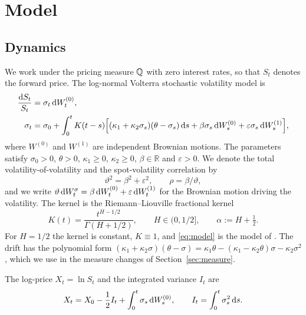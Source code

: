 \section{Model}\label{sec:model}

\subsection{Dynamics}

We work under the pricing measure $\mathbb{Q}$ with zero interest rates, so that $S_t$ denotes the forward price. The log-normal Volterra stochastic volatility model is
\begin{equation}\label{eq:model}
\begin{split}
\frac{\D S_t}{S_t} &= \sigma_t\,\D W^{(0)}_t,\\
\sigma_t &= \sigma_0+\int_0^t K(t-s)\Big[(\kappa_1+\kappa_2\sigma_s)(\theta-\sigma_s)\,\D s+\beta\sigma_s\,\D W^{(0)}_s+\varepsilon\sigma_s\,\D W^{(1)}_s\Big],
\end{split}
\end{equation}
where $W^{(0)}$ and $W^{(1)}$ are independent Brownian motions. The parameters satisfy $\sigma_0>0$, $\theta>0$, $\kappa_1\ge0$, $\kappa_2\ge0$, $\beta\in\mathbb{R}$ and $\varepsilon>0$. We denote the total volatility-of-volatility and the spot-volatility correlation by
\begin{equation}\label{eq:vartheta}
\vartheta^2=\beta^2+\varepsilon^2,\qquad \rho=\beta/\vartheta,
\end{equation}
and we write $\vartheta\,\mathrm{d} W^{\sigma}_t=\beta\,\mathrm{d} W^{(0)}_t+\varepsilon\,\mathrm{d} W^{(1)}_t$ for the Brownian motion driving the volatility. The kernel is the Riemann--Liouville fractional kernel
\begin{equation}\label{eq:kernel}
K(t)=\frac{t^{H-1/2}}{\Gamma(H+1/2)},\qquad H\in(0,1/2],\qquad \alpha:=H+\tfrac12 .
\end{equation}
For $H=1/2$ the kernel is constant, $K\equiv1$, and \eqref{eq:model} is the model of \citet{SeppRakhmonov2023}. The drift has the polynomial form $(\kappa_1+\kappa_2\sigma)(\theta-\sigma)=\kappa_1\theta-(\kappa_1-\kappa_2\theta)\sigma-\kappa_2\sigma^2$, which we use in the measure changes of Section~\ref{sec:measure}.

The log-price $X_t=\ln S_t$ and the integrated variance $I_t$ are
\begin{equation}\label{eq:logprice}
X_t=X_0-\frac12 I_t+\int_0^t\sigma_s\,\D W^{(0)}_s,\qquad I_t=\int_0^t\sigma_s^2\,\D s .
\end{equation}

